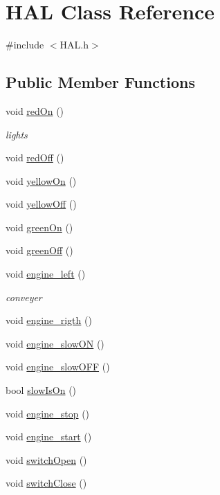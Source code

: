 \hypertarget{class_h_a_l}{\section{H\-A\-L Class Reference}
\label{class_h_a_l}
}


{\ttfamily \#include $<$H\-A\-L.\-h$>$}

\subsection*{Public Member Functions}
\begin{DoxyCompactItemize}
\item 
void \hyperlink{class_h_a_l_a9ff83439d72ca8a6052e53e256887e73}{red\-On} ()
\begin{DoxyCompactList}\small\item\em lights \end{DoxyCompactList}\item 
void \hyperlink{class_h_a_l_a7ad5008f959d269c1ec08a0819f42f8d}{red\-Off} ()
\item 
void \hyperlink{class_h_a_l_a44cde8d09671df13878b6a0f13370bff}{yellow\-On} ()
\item 
void \hyperlink{class_h_a_l_ac00c6620a2fdbed2f60caded31de1c86}{yellow\-Off} ()
\item 
void \hyperlink{class_h_a_l_ae9af9ba65709973ef74f9ef21feab5e7}{green\-On} ()
\item 
void \hyperlink{class_h_a_l_a7c7cf883adc8bc8269686b4bc9807c46}{green\-Off} ()
\item 
void \hyperlink{class_h_a_l_a65320182dfa8080e067f2b50b1670fa5}{engine\-\_\-left} ()
\begin{DoxyCompactList}\small\item\em conveyer \end{DoxyCompactList}\item 
void \hyperlink{class_h_a_l_a554579a6e7c46052377e24a4cd04a9cd}{engine\-\_\-rigth} ()
\item 
void \hyperlink{class_h_a_l_a87ee7251a47176e50c88e4a98c389567}{engine\-\_\-slow\-O\-N} ()
\item 
void \hyperlink{class_h_a_l_a3dff4d1e1b8b0c5b0b60ac7c1ca72cfc}{engine\-\_\-slow\-O\-F\-F} ()
\item 
bool \hyperlink{class_h_a_l_a28eb7a9c1846465a49384667b705f636}{slow\-Is\-On} ()
\item 
void \hyperlink{class_h_a_l_a3b46caa6b77450aa249134d3661f1885}{engine\-\_\-stop} ()
\item 
void \hyperlink{class_h_a_l_a1248c17a3ea9acd85fac3d8e2d6baf16}{engine\-\_\-start} ()
\item 
void \hyperlink{class_h_a_l_a9894ab6b4f352b40d6ed617fa0cb2021}{switch\-Open} ()
\item 
void \hyperlink{class_h_a_l_a9d0bbb1f0bdd80b226343c5823183e70}{switch\-Close} ()
\end{DoxyCompactItemize}
